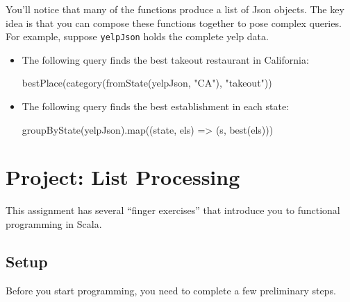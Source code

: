 \documentclass[9pt]{extbook}
\begin{document}
\noindent You'll notice that many of the functions produce a list of Json
objects. The key idea is that you can compose these functions together to
pose complex queries. For example, suppose \texttt{yelpJson} holds the
complete yelp data.

\begin{itemize}
\item The following query finds the best takeout restaurant in California:
    \begin{scalacode}
    bestPlace(category(fromState(yelpJson, "CA"), "takeout"))
    \end{scalacode}

\item The following query finds the best establishment in each state:
    \begin{scalacode}
    groupByState(yelpJson).map((state, els) => (s, best(els)))
    \end{scalacode}
\end{itemize}



\chapter{Project: List Processing}

This assignment has several ``finger exercises'' that introduce you
to functional programming in Scala.

\section{Setup}

Before you start programming, you need to complete a few preliminary steps.
\end{document}
